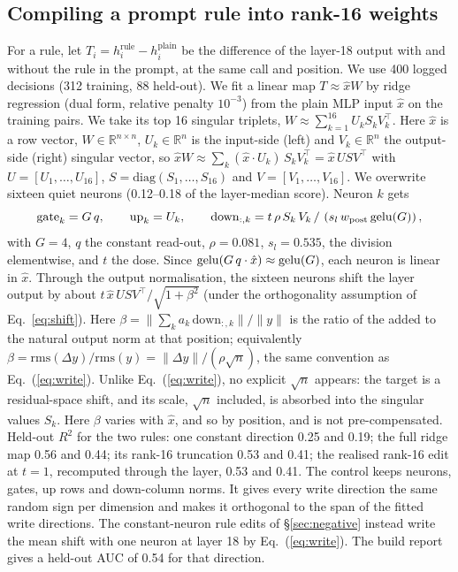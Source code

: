 \subsection{Compiling a prompt rule into rank-16 weights}
\label{app:rule}
For a rule, let $T_i = h^{\mathrm{rule}}_i - h^{\mathrm{plain}}_i$ be the difference of the layer-18 output with and without the rule in the prompt, at the same call and position. We use 400 logged decisions (312 training, 88 held-out). We fit a linear map $T \approx \hat{x} W$ by ridge regression (dual form, relative penalty $10^{-3}$) from the plain MLP input $\hat{x}$ on the training pairs. We take its top 16 singular triplets, $W \approx \sum_{k=1}^{16} U_k S_k V_k^{\top}$. Here $\hat{x}$ is a row vector, $W \in \mathbb{R}^{n \times n}$, $U_k \in \mathbb{R}^n$ is the input-side (left) and $V_k \in \mathbb{R}^n$ the output-side (right) singular vector, so $\hat{x} W \approx \sum_k (\hat{x} \cdot U_k)\, S_k V_k^{\top} = \hat{x}\, U S V^{\top}$ with $U = [U_1, \dots, U_{16}]$, $S = \mathrm{diag}(S_1, \dots, S_{16})$ and $V = [V_1, \dots, V_{16}]$. We overwrite sixteen quiet neurons (0.12--0.18 of the layer-median score). Neuron $k$ gets
\begin{equation}
\label{eq:rule}
    \mathrm{gate}_k = G\, q, \qquad \mathrm{up}_k = U_k, \qquad \mathrm{down}_{:,k} = t\, \rho\, S_k\, V_k \,/\, \left(s_l\, w_{\mathrm{post}}\, \mathrm{gelu}(G)\right),
\end{equation}
with $G = 4$, $q$ the constant read-out, $\rho = 0.081$, $s_l = 0.535$, the division elementwise, and $t$ the dose. Since $\mathrm{gelu}(G\, q \cdot \hat{x}) \approx \mathrm{gelu}(G)$, each neuron is linear in $\hat{x}$. Through the output normalisation, the sixteen neurons shift the layer output by about $t\, \hat{x}\, U S V^{\top} / \sqrt{1 + \beta^2}$ (under the orthogonality assumption of Eq.~\ref{eq:shift}). Here $\beta = \lVert \sum_k a_k\, \mathrm{down}_{:,k} \rVert / \lVert y \rVert$ is the ratio of the added to the natural output norm at that position; equivalently $\beta = \mathrm{rms}(\Delta y)/\mathrm{rms}(y) = \lVert \Delta y \rVert / (\rho\sqrt{n})$, the same convention as Eq.~(\ref{eq:write}). Unlike Eq.~(\ref{eq:write}), no explicit $\sqrt{n}$ appears: the target is a residual-space shift, and its scale, $\sqrt{n}$ included, is absorbed into the singular values $S_k$. Here $\beta$ varies with $\hat{x}$, and so by position, and is not pre-compensated. Held-out $R^2$ for the two rules: one constant direction 0.25 and 0.19; the full ridge map 0.56 and 0.44; its rank-16 truncation 0.53 and 0.41; the realised rank-16 edit at $t = 1$, recomputed through the layer, 0.53 and 0.41. The control keeps neurons, gates, up rows and down-column norms. It gives every write direction the same random sign per dimension and makes it orthogonal to the span of the fitted write directions. The constant-neuron rule edits of \S\ref{sec:negative} instead write the mean shift with one neuron at layer 18 by Eq.~(\ref{eq:write}). The build report gives a held-out AUC of 0.54 for that direction.
